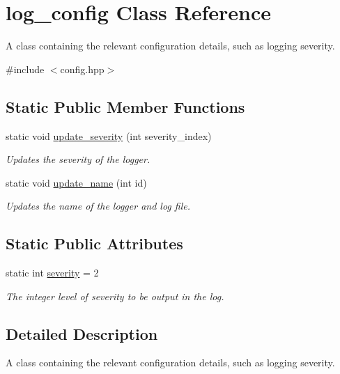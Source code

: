 \hypertarget{classlog__config}{\section{log\-\_\-config Class Reference}
\label{classlog__config}
}


A class containing the relevant configuration details, such as logging severity.  




{\ttfamily \#include $<$config.\-hpp$>$}

\subsection*{Static Public Member Functions}
\begin{DoxyCompactItemize}
\item 
static void \hyperlink{classlog__config_a00103c7e762a66cb5e7717f3dfb46c53}{update\-\_\-severity} (int severity\-\_\-index)
\begin{DoxyCompactList}\small\item\em Updates the severity of the logger. \end{DoxyCompactList}\item 
static void \hyperlink{classlog__config_ae9fa43978bbf0007ff911eed5b46d17c}{update\-\_\-name} (int id)
\begin{DoxyCompactList}\small\item\em Updates the name of the logger and log file. \end{DoxyCompactList}\end{DoxyCompactItemize}
\subsection*{Static Public Attributes}
\begin{DoxyCompactItemize}
\item 
\hypertarget{classlog__config_a834f2cce03a7594e4f112d21ff72d260}{static int \hyperlink{classlog__config_a834f2cce03a7594e4f112d21ff72d260}{severity} = 2}\label{classlog__config_a834f2cce03a7594e4f112d21ff72d260}

\begin{DoxyCompactList}\small\item\em The integer level of severity to be output in the log. \end{DoxyCompactList}\end{DoxyCompactItemize}


\subsection{Detailed Description}
A class containing the relevant configuration details, such as logging severity. 



